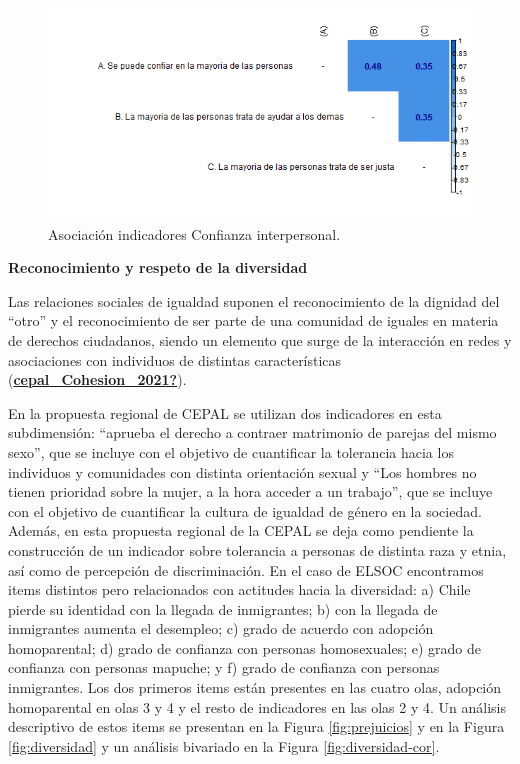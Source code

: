 \documentclass[
  12pt,
]{book}
\begin{document}
\begin{figure}[H]

{\centering \includegraphics[width=1\linewidth,height=1\textheight]{output/graphs/confianza-interpersonal_cor} 

}

\caption{Asociación indicadores Confianza interpersonal.}\label{fig:confianza-interpersonal-cor}
\end{figure}

\textbf{Reconocimiento y respeto de la diversidad}

Las relaciones sociales de igualdad suponen el reconocimiento de la dignidad del ``otro'' y el reconocimiento de ser parte de una comunidad de iguales en materia de derechos ciudadanos, siendo un elemento que surge de la interacción en redes y asociaciones con individuos de distintas características (\protect\hyperlink{ref-cepal_Cohesion_2021}{\textbf{cepal\_Cohesion\_2021?}}).

En la propuesta regional de CEPAL se utilizan dos indicadores en esta subdimensión: ``aprueba el derecho a contraer matrimonio de parejas del mismo sexo'', que se incluye con el objetivo de cuantificar la tolerancia hacia los individuos y comunidades con distinta orientación sexual y ``Los hombres no tienen prioridad sobre la mujer, a la hora acceder a un trabajo'', que se incluye con el objetivo de cuantificar la cultura de igualdad de género en la sociedad. Además, en esta propuesta regional de la CEPAL se deja como pendiente la construcción de un indicador sobre tolerancia a personas de distinta raza y etnia, así como de percepción de discriminación. En el caso de ELSOC encontramos items distintos pero relacionados con actitudes hacia la diversidad: a) Chile pierde su identidad con la llegada de inmigrantes; b) con la llegada de inmigrantes aumenta el desempleo; c) grado de acuerdo con adopción homoparental; d) grado de confianza con personas homosexuales; e) grado de confianza con personas mapuche; y f) grado de confianza con personas inmigrantes. Los dos primeros items están presentes en las cuatro olas, adopción homoparental en olas 3 y 4 y el resto de indicadores en las olas 2 y 4. Un análisis descriptivo de estos items se presentan en la Figura \ref{fig:prejuicios} y en la Figura \ref{fig:diversidad} y un análisis bivariado en la Figura \ref{fig:diversidad-cor}.
\end{document}
